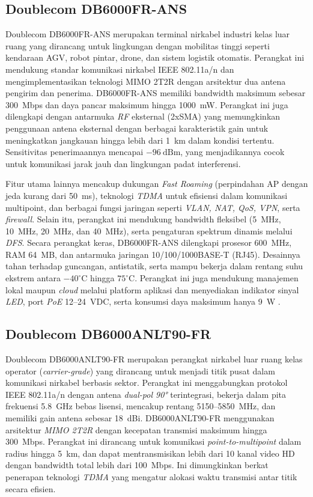 \subsection{Doublecom DB6000FR-ANS}

Doublecom DB6000FR-ANS merupakan terminal nirkabel industri kelas luar ruang yang dirancang untuk lingkungan dengan mobilitas tinggi seperti kendaraan AGV, robot pintar, drone, dan sistem logistik otomatis. Perangkat ini mendukung standar komunikasi nirkabel IEEE 802.11a/n dan mengimplementasikan teknologi MIMO 2T2R dengan arsitektur dua antena pengirim dan penerima. DB6000FR-ANS memiliki bandwidth maksimum sebesar 300~Mbps dan daya pancar maksimum hingga 1000~mW. Perangkat ini juga dilengkapi dengan antarmuka \emph{RF} eksternal (2xSMA) yang memungkinkan penggunaan antena eksternal dengan berbagai karakteristik gain untuk meningkatkan jangkauan hingga lebih dari 1~km dalam kondisi tertentu. Sensitivitas penerimaannya mencapai \(-96~\text{dBm}\), yang menjadikannya cocok untuk komunikasi jarak jauh dan lingkungan padat interferensi.

Fitur utama lainnya mencakup dukungan \emph{Fast Roaming} (perpindahan AP dengan jeda kurang dari 50~ms), teknologi \emph{TDMA} untuk efisiensi dalam komunikasi multipoint, dan berbagai fungsi jaringan seperti \emph{VLAN, NAT, QoS, VPN}, serta \emph{firewall}. Selain itu, perangkat ini mendukung bandwidth fleksibel (5~MHz, 10~MHz, 20~MHz, dan 40~MHz), serta pengaturan spektrum dinamis melalui \emph{DFS}. Secara perangkat keras, DB6000FR-ANS dilengkapi prosesor 600~MHz, RAM 64~MB, dan antarmuka jaringan 10/100/1000BASE-T (RJ45). Desainnya tahan terhadap guncangan, antistatik, serta mampu bekerja dalam rentang suhu ekstrem antara \(-40^\circ\text{C}\) hingga \(75^\circ\text{C}\). Perangkat ini juga mendukung manajemen lokal maupun \emph{cloud} melalui platform aplikasi dan menyediakan indikator sinyal \emph{LED}, port \emph{PoE} 12--24~VDC, serta konsumsi daya maksimum hanya 9~W \cite{doublecom_db6000frans}.

\subsection{Doublecom DB6000ANLT90-FR}
Doublecom DB6000ANLT90-FR merupakan perangkat nirkabel luar ruang kelas operator (\emph{carrier-grade}) yang dirancang untuk menjadi titik pusat dalam komunikasi nirkabel berbasis sektor. Perangkat ini menggabungkan protokol IEEE 802.11a/n dengan antena \emph{dual-pol 90°} terintegrasi, bekerja dalam pita frekuensi 5.8~GHz bebas lisensi, mencakup rentang 5150--5850~MHz, dan memiliki gain antena sebesar 18~dBi. DB6000ANLT90-FR menggunakan arsitektur \emph{MIMO 2T2R} dengan kecepatan transmisi maksimum hingga 300~Mbps. Perangkat ini dirancang untuk komunikasi \emph{point-to-multipoint} dalam radius hingga 5~km, dan dapat mentransmisikan lebih dari 10 kanal video HD dengan bandwidth total lebih dari 100~Mbps. Ini dimungkinkan berkat penerapan teknologi \emph{TDMA} yang mengatur alokasi waktu transmisi antar titik secara efisien.

